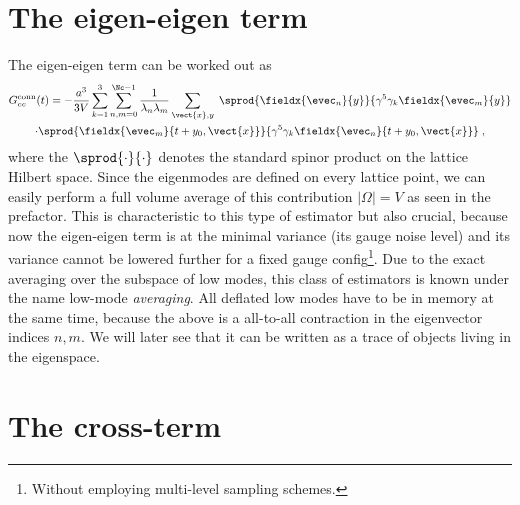 \section{The eigen-eigen term}
\label{sec:lma:ee}

The eigen-eigen term can be worked out as
\begin{multline} \label{eq:Gconn:eigen-eigen}
G_{ee}^{\text{conn}}(t)
= - \frac{a^{3}}{3 V}
\sum_{k=1}^{3}
\sum_{n,m=0}^{\Nc-1} \frac{1}{\lambda_{n} \lambda_{m}}
\sum_{\vect{x},y} \;
\sprod{
  \fieldx{\evec_{n}}{y}
}{
  \gamma^{5}
  \gamma_k
  \fieldx{\evec_{m}}{y}
} \\
\cdot
\sprod{
  \fieldx{\evec_{m}}{t+y_0, \vect{x}}
}{
  \gamma^{5}
  \gamma_k
  \fieldx{\evec_{n}}{t+y_0, \vect{x}}
} \;,
\end{multline}
where the $\sprod{\cdot}{\cdot}$ denotes the standard spinor product on the lattice Hilbert space.
Since the eigenmodes are defined on every lattice point, we can easily perform a full volume average of this contribution $\lvert \Omega \rvert = V$ as seen in the prefactor.
This is characteristic to this type of estimator but also crucial, because now the eigen-eigen term is at the minimal variance (its gauge noise level) and its variance cannot be lowered further for a fixed gauge config\footnote{Without employing multi-level sampling schemes.}.
Due to the exact averaging over the subspace of low modes, this class of estimators is known under the name low-mode \emph{averaging}.
All deflated low modes have to be in memory at the same time, because the above is a all-to-all contraction in the eigenvector indices $n,m$.
We will later see that it can be written as a trace of objects living in the eigenspace.

\section{The cross-term}
\label{sec:lma:x}

